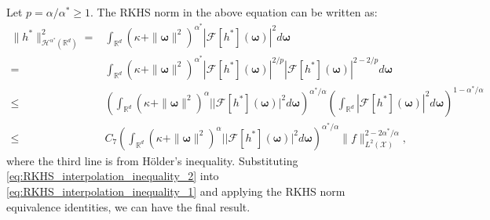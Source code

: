 \documentclass[aos,preprint]{imsart}
\theoremstyle{plain}
\newcommand{\Real}{\mathbb R}
\newcommand{\CalH}{\mathcal H}
\newcommand{\CalX}{\mathcal X}
\newcommand{\CalF}{\mathcal{F}}
\newcommand{\Bomega}{\boldsymbol{\omega}}
\theoremstyle{remark}
\begin{document}
\begin{appendix}
Let $p=\alpha/\alpha^*\geq 1$. The RKHS norm in the above equation can be written as:
\begin{align}
    \|h^*\|_{\CalH^{\alpha^*}(\Real^d)}^2=&\int_{\Real^d}(\kappa+\|\Bomega\|^2)^{\alpha^*}|\CalF[h^*](\Bomega)|^2 d\Bomega\nonumber\\
    =& \int_{\Real^d}(\kappa+\|\Bomega\|^2)^{\alpha^*}|\CalF[h^*](\Bomega)|^{2/p}|\CalF[h^*](\Bomega)|^{2-2/p} d\Bomega\nonumber\\
    \leq & \left(\int_{\Real^d}(\kappa+\|\Bomega\|^2)^{\alpha}||\CalF[h^*](\Bomega)|^{2} d\Bomega\right)^{\alpha^*/\alpha}\left(\int_{\Real^d}|\CalF[h^*](\Bomega)|^{2}d\Bomega\right)^{1-\alpha^*/\alpha}\nonumber\\
    \leq & C_7 \left(\int_{\Real^d}(\kappa+\|\Bomega\|^2)^{\alpha}||\CalF[h^*](\Bomega)|^{2} d\Bomega\right)^{\alpha^*/\alpha}\|f\|_{L^2(\CalX)}^{2-2\alpha^*/\alpha} \label{eq:RKHS_interpolation_inequality_2},
\end{align}
where the third line is from H\"older's inequality. Substituting \eqref{eq:RKHS_interpolation_inequality_2} into \eqref{eq:RKHS_interpolation_inequality_1} and applying the RKHS norm equivalence identities, we can have the final result.
\endproof





\end{appendix}
\end{document}
